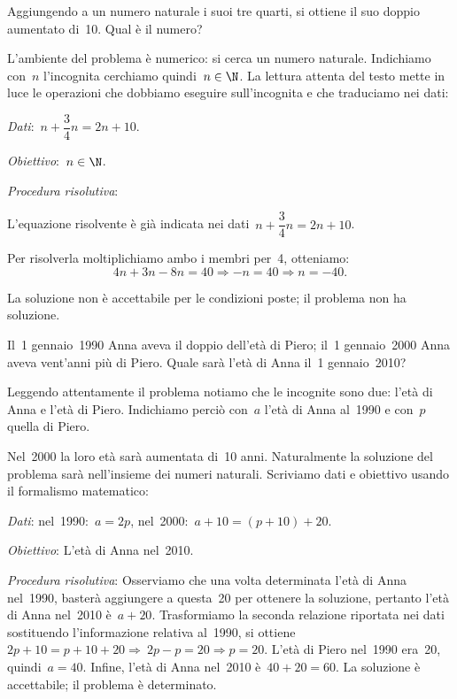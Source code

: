 \begin{problema}{}{}
Aggiungendo a un numero naturale i suoi tre quarti, si ottiene il suo
doppio aumentato di~10. Qual è il numero?
\end{problema}

\begin{soluzione}{}{}
L'ambiente del problema è numerico: si cerca un numero naturale. 
Indichiamo con~\(n\) l'incognita cerchiamo quindi~\(n\in\N\). 
La lettura attenta del testo mette in luce le operazioni che dobbiamo 
eseguire sull'incognita e che traduciamo nei dati:

\emph{Dati}:~\(n+\dfrac{3}{4}n=2n+10\).

\emph{Obiettivo}:~\(n\in\N\).

\emph{Procedura risolutiva}:

L'equazione risolvente è già indicata nei dati~\(n+\dfrac{3}{4}n=2n+10\).

Per risolverla moltiplichiamo ambo i membri per~4, otteniamo:
\[4n+3n-8n=40\Rightarrow -n=40\Rightarrow n=-40.\]

La soluzione non è accettabile per le condizioni poste; il problema
non ha soluzione.
\end{soluzione}

\begin{problema}{}{}
Il~1{\textdegree} gennaio~1990 Anna aveva il doppio
dell'età di Piero; il~1{\textdegree} gennaio~2000
Anna aveva vent'anni più di Piero. Quale sarà
l'età di Anna il~1{\textdegree} gennaio~2010?
\end{problema}

\begin{soluzione}{}{}
Leggendo attentamente il problema notiamo che le incognite sono due:
l'età di Anna e l'età di Piero.
Indichiamo perciò con~\(a\) l'età di
Anna al~1990 e con~\(p\) quella di Piero.

Nel~2000 la loro età sarà aumentata di~10 anni. Naturalmente la
soluzione del problema sarà nell'insieme dei numeri
naturali. Scriviamo dati e obiettivo usando il formalismo matematico:

\emph{Dati}: nel~1990:~\(a = 2p\), nel~2000:~\(a +10 = (p +10) +20\).

\emph{Obiettivo}: L'età di Anna nel~2010.

\emph{Procedura risolutiva}:
Osserviamo che una volta determinata l'età di Anna
nel~1990, basterà aggiungere a questa~20 per ottenere la soluzione,
pertanto l'età di Anna nel~2010 è~\(a+20\).
Trasformiamo la seconda relazione riportata nei dati sostituendo
l'informazione relativa al~1990,
si ottiene~\(2p+10=p+10+20\Rightarrow~2p-p=20\Rightarrow p=20.\)
L'età di Piero nel~1990 era~20, quindi~\(a=40\).
Infine, l'età di Anna nel~2010 è~\(40+20=60\).
La soluzione è accettabile; il problema è determinato.
\end{soluzione}

